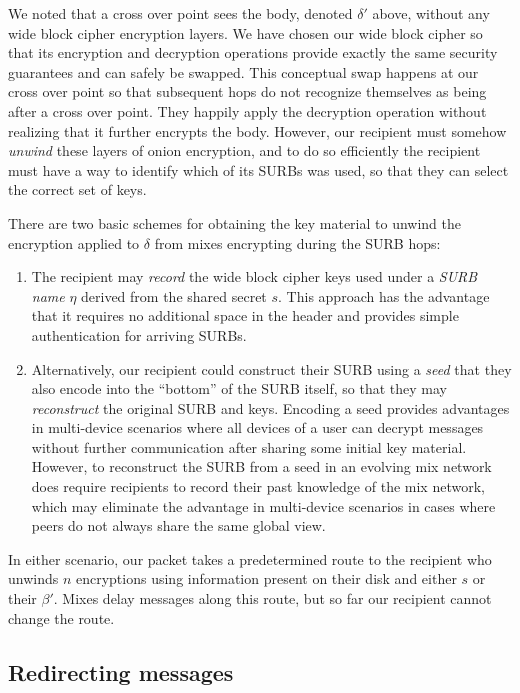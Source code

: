We noted that a cross over point sees the body, denoted $\delta'$
above, without any wide block cipher encryption layers.  We have
chosen our wide block cipher so that its encryption and decryption
operations provide exactly the same security guarantees and can
safely be swapped.  This conceptual swap happens at our cross over
point so that subsequent hops do not recognize themselves as being
after a cross over point.  They happily apply the decryption
operation without realizing that it further encrypts the body.
However, our recipient must somehow {\em unwind} these layers of
onion encryption, and to do so efficiently the recipient must have
a way to identify which of its SURBs was used, so that they
can select the correct set of keys.

There are two basic schemes for obtaining the key material to
unwind the encryption applied to $\delta$ from mixes encrypting
during the SURB hops:

\begin{enumerate}
 \item The recipient may {\em record} the wide block cipher keys used
   under a {\it SURB name} $\eta$ derived from the shared secret $s$.
   This approach has the advantage that it requires no additional
   space in the header and provides simple authentication for arriving
   SURBs.

 \item Alternatively, our recipient could construct their SURB using a
   {\em seed} that they also encode into the ``bottom'' of the SURB
   itself, so that they may {\em reconstruct} the original SURB and
   keys.  Encoding a seed provides advantages in multi-device
   scenarios where all devices of a user can decrypt messages without
   further communication after sharing some initial key material.
   However, to reconstruct the SURB from a seed in an evolving mix
   network does require recipients to record their past knowledge of
   the mix network, which may eliminate the advantage in multi-device
   scenarios in cases where peers do not always share the same global
   view.
\end{enumerate}

In either scenario, our packet takes a predetermined route to the
recipient who unwinds $n$ encryptions using information present on
their disk and either $s$ or their $\beta'$.  Mixes delay
messages along this route, but so far our recipient cannot change
the route. 

\subsection{Redirecting messages}

